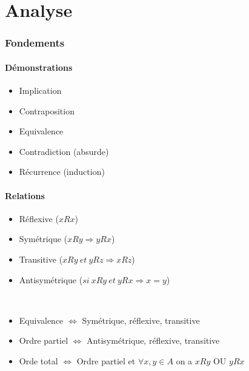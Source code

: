 

\usepackage[hideerrors]{xcolor}
\usepackage{array}
\usepackage{amsmath}
\usepackage{amssymb}
\usepackage{amsthm}
\usepackage{fancybox}
\usepackage{float}
\usepackage{colortbl}
\usepackage{makecell}
\usepackage{graphicx}
\usepackage{titlesec}
\usepackage{qtree}
\usepackage{tensor}

\DeclareMathOperator{\Sur}{Sur}
\DeclareMathOperator{\In}{In}
\DeclareMathOperator{\newnull}{null}
\DeclareMathOperator{\newim}{Im}
\DeclareMathOperator{\newker}{Ker}
\DeclareMathOperator{\cof}{cof}
\DeclareMathOperator{\rang}{rang}

\renewcommand{\labelitemi}{$\qquad \star$}


\part{Analyse}
\section{Fondements}
\subsection{Démonstrations}
\begin{itemize}
\item Implication
\item Contraposition
\item Equivalence
\item Contradiction (absurde)
\item Récurrence (induction)
\end{itemize}
\subsection{Relations}
\begin{itemize}
\item Réflexive ($xRx$)
\item Symétrique ($xRy \Rightarrow yRx$)
\item Transitive ($ xRy\ et\ yRz \Rightarrow xRz$)
\item Antisymétrique ($si\ xRy\ et\ yRx \Rightarrow x = y$)
\end{itemize}
\ \\
\begin{itemize}
\item Equivalence $\Leftrightarrow$ Symétrique, réflexive, transitive
\item Ordre partiel $\Leftrightarrow$ Antisymétrique, réflexive, transitive
\item Orde total $\Leftrightarrow$ Ordre partiel et $\forall x, y \in A$  on a $xRy$ OU $yRx$
\end{itemize}
